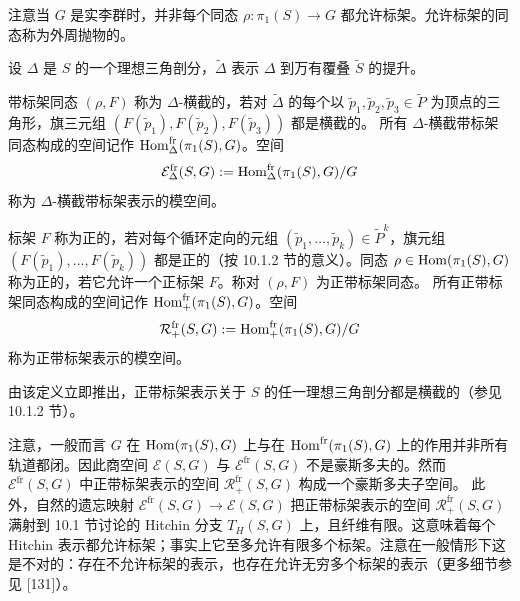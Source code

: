 \begin{remark}[10.7] 注意当 $G$ 是实李群时，并非每个同态 $\rho:\pi_1(S)\to G$ 都允许标架。允许标架的同态称为外周抛物的。
\end{remark}

设 $\Delta$ 是 $S$ 的一个理想三角剖分，$\tilde\Delta$ 表示 $\Delta$ 到万有覆叠 $\tilde S$ 的提升。

\begin{definition}[10.8] 带标架同态 $(\rho,F)$ 称为 $\Delta$-横截的，若对 $\tilde\Delta$ 的每个以 $\tilde p_1,\tilde p_2,\tilde p_3\in\tilde P$ 为顶点的三角形，旗三元组 $(F(\tilde p_1),F(\tilde p_2),F(\tilde p_3))$ 都是横截的。
所有 $\Delta$-横截带标架同态构成的空间记作 $\operatorname{Hom}^{\mathrm{fr}}_\Delta(\pi_1(S),G)$。空间
\[
\mathcal{E}^{\mathrm{fr}}_\Delta(S,G) := \operatorname{Hom}^{\mathrm{fr}}_\Delta(\pi_1(S),G)/G
\]
称为 $\Delta$-横截带标架表示的模空间。
\end{definition}

\begin{definition}[10.9] 标架 $F$ 称为正的，若对每个循环定向的元组 $(\tilde p_1,\dots,\tilde p_k)\in\tilde P^k$，旗元组 $(F(\tilde p_1),\dots,F(\tilde p_k))$ 都是正的（按 10.1.2 节的意义）。同态 $\rho\in\operatorname{Hom}(\pi_1(S),G)$ 称为正的，若它允许一个正标架 $F$。称对 $(\rho,F)$ 为正带标架同态。
所有正带标架同态构成的空间记作 $\operatorname{Hom}^{\mathrm{fr}}_+(\pi_1(S),G)$。空间
\[
\mathcal{R}^{\mathrm{fr}}_+(S,G) := \operatorname{Hom}^{\mathrm{fr}}_+(\pi_1(S),G)/G
\]
称为正带标架表示的模空间。
\end{definition}

\begin{remark}[10.10] 由该定义立即推出，正带标架表示关于 $S$ 的任一理想三角剖分都是横截的（参见 10.1.2 节）。
\end{remark}

\begin{remark}[10.11] 注意，一般而言 $G$ 在 $\operatorname{Hom}(\pi_1(S),G)$ 上与在 $\operatorname{Hom}^{\mathrm{fr}}(\pi_1(S),G)$ 上的作用并非所有轨道都闭。因此商空间 $\mathcal{E}(S,G)$ 与 $\mathcal{E}^{\mathrm{fr}}(S,G)$ 不是豪斯多夫的。然而 $\mathcal{E}^{\mathrm{fr}}(S,G)$ 中正带标架表示的空间 $\mathcal{R}^{\mathrm{fr}}_+(S,G)$ 构成一个豪斯多夫子空间。
此外，自然的遗忘映射 $\mathcal{E}^{\mathrm{fr}}(S,G)\to\mathcal{E}(S,G)$ 把正带标架表示的空间 $\mathcal{R}^{\mathrm{fr}}_+(S,G)$ 满射到 10.1 节讨论的 Hitchin 分支 $T_H(S,G)$ 上，且纤维有限。这意味着每个 Hitchin 表示都允许标架；事实上它至多允许有限多个标架。注意在一般情形下这是不对的：存在不允许标架的表示，也存在允许无穷多个标架的表示（更多细节参见 [131]）。
\end{remark}

